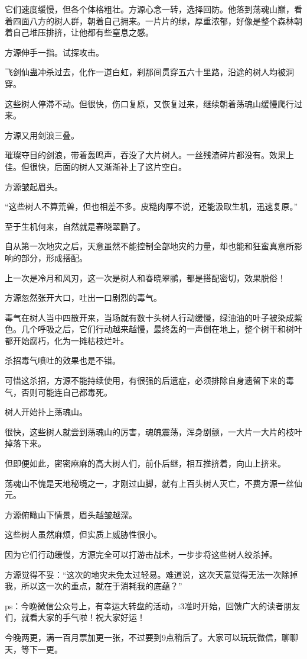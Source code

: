 \begin{this_body}
它们速度缓慢，但各个体格粗壮。方源心念一转，选择回防。他落到荡魂山巅，看着四面八方的树人群，朝着自己拥来。一片片的绿，厚重浓郁，好像是整个森林朝着自己堆压排挤，让他都有些窒息之感。

方源伸手一指。试探攻击。

飞剑仙蛊冲杀过去，化作一道白虹，刹那间贯穿五六十里路，沿途的树人均被洞穿。

这些树人停滞不动。但很快，伤口复原，又恢复过来，继续朝着荡魂山缓慢爬行过来。

方源又用剑浪三叠。

璀璨夺目的剑浪，带着轰鸣声，吞没了大片树人。一丝残渣碎片都没有。效果上佳。但很快，后面的树人又渐渐补上了这片空白。

方源皱起眉头。

“这些树人不算荒兽，但也相差不多。皮糙肉厚不说，还能汲取生机，迅速复原。”

至于生机何来，自然就是春晓翠鹂了。

自从第一次地灾之后，天意虽然不能控制全部地灾的力量，却也能和狂蛮真意所影响的部分，形成搭配。

上一次是冷月和风刃，这一次是树人和春晓翠鹂，都是搭配密切，效果脱俗！

方源忽然张开大口，吐出一口剧烈的毒气。

毒气在树人当中四散开来，当场就有数十头树人行动缓慢，绿油油的叶子被染成紫色。几个呼吸之后，它们行动越来越慢，最终轰的一声倒在地上，整个树干和树叶都开始腐朽，化为一摊枯枝烂叶。

杀招毒气喷吐的效果也是不错。

可惜这杀招，方源不能持续使用，有很强的后遗症，必须排除自身遗留下来的毒气，否则可能连自己都毒死。

树人开始扑上荡魂山。

很快，这些树人就尝到荡魂山的厉害，魂魄震荡，浑身剧颤，一大片一大片的枝叶掉落下来。

但即便如此，密密麻麻的高大树人们，前仆后继，相互推挤着，向山上挤来。

荡魂山不愧是天地秘境之一，才刚过山脚，就有上百头树人灭亡，不费方源一丝仙元。

方源俯瞰山下情景，眉头越皱越深。

这些树人虽然麻烦，但实质上威胁性很小。

因为它们行动缓慢，方源完全可以打游击战术，一步步将这些树人绞杀掉。

方源觉得不妥：“这次的地灾未免太过轻易。难道说，这次天意觉得无法一次除掉我，所以这一次的重点，就在于消耗我的底蕴？”

ps：今晚微信公众号上，有幸运大转盘的活动，:3准时开始，回馈广大的读者朋友们，就看大家的手气啦！祝大家好运！

今晚两更，满一百月票加更一张，不过要到9点稍后了。大家可以玩玩微信，聊聊天，等下一更。

\end{this_body}

